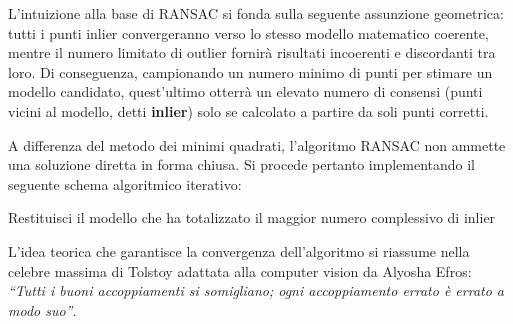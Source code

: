 ﻿\documentclass[11pt, a4paper]{article}
\begin{document}
L'intuizione alla base di RANSAC si fonda sulla seguente assunzione geometrica: tutti i punti inlier convergeranno verso lo stesso modello matematico coerente, mentre il numero limitato di outlier fornirà risultati incoerenti e discordanti tra loro. Di conseguenza, campionando un numero minimo di punti per stimare un modello candidato, quest'ultimo otterrà un elevato numero di consensi (punti vicini al modello, detti \textbf{inlier}) solo se calcolato a partire da soli punti corretti.

A differenza del metodo dei minimi quadrati, l'algoritmo RANSAC non ammette una soluzione diretta in forma chiusa. Si procede pertanto implementando il seguente schema algoritmico iterativo:

\begin{algorithm}[H]
\;
Restituisci il modello che ha totalizzato il maggior numero complessivo di inlier\;
\caption{Algoritmo RANSAC per la stima robusta}
\end{algorithm}



L'idea teorica che garantisce la convergenza dell'algoritmo si riassume nella celebre massima di Tolstoy adattata alla computer vision da Alyosha Efros: \emph{``Tutti i buoni accoppiamenti si somigliano; ogni accoppiamento errato è errato a modo suo''}.
\end{document}

